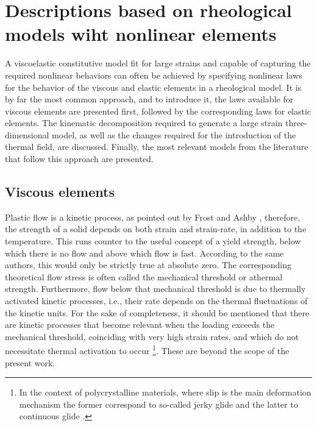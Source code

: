 \section{Descriptions based on rheological models wiht nonlinear elements}

A viscoelastic constitutive model fit for large strains and capable of capturing the required nonlinear behaviors can often be achieved by specifying nonlinear laws for the behavior of the viscous and elastic elements in a rheological model.
It is by far the most common approach, and to introduce it, the laws available for viscous elements are presented first, followed by the corresponding laws for elastic elements.
The kinematic decomposition required to generate a large strain three-dimensional model, as well as the changes required for the introduction of the thermal field, are discussed.
Finally, the most relevant models from the literature that follow this approach are presented.


\subsection{Viscous elements}
\label{sec:viscous_elements}

Plastic flow is a kinetic process, as pointed out by Frost and Ashby \citep{frostDeformationmechanismMapsPlasticity1982}, therefore, the strength of a solid depends on both strain and strain-rate, in addition to the temperature.
This runs counter to the useful concept of a yield strength, below which there is no flow and above which flow is fast.
According to the same authors, this would only be strictly true at absolute zero.
The corresponding theoretical flow stress is often called the mechanical threshold or athermal strength.
Furthermore, flow below that mechanical threshold is due to thermally activated kinetic processes, i.e., their rate depends on the thermal fluctuations of the kinetic units.
For the sake of completeness, it should be mentioned that there are kinetic processes that become relevant when the loading exceeds the mechanical threshold, coinciding with very high strain rates, and which do not necessitate thermal activation to occur \citep{kocks1975thermodynamics}\footnote{In the context of polycrystalline materials, where slip is the main deformation mechanism the former correspond to so-called jerky glide and the latter to continuous glide \citep{kocks1975thermodynamics}.}.
These are beyond the scope of the present work.

